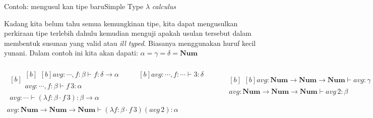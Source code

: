 \documentclass[aspectratio=1610,10pt,handout]{beamer}
\newcommand{\lc}{$\lambda$ {\it calculus}\ }
\begin{document}
\begin{frame}{Contoh: mengusul kan tipe baru}{Simple Type \lc }

	Kadang kita belum tahu semua kemungkinan tipe, kita dapat mengusulkan perkiraan tipe terlebih dahulu kemudian menguji apakah usulan tersebut dalam membentuk susunan yang valid atau \emph{ill typed}. Biasanya menggunakan huruf kecil yunani. Dalam contoh ini kita akan dapati: $\alpha = \gamma = \delta = \mathbf{Num}$

	\begingroup\tiny%
	\[
	\begin{gathered}
	\begin{gathered}[b]
	\begin{gathered}[b]
	\begin{gathered}[b]
	\hline
	\mathit{avg} : \cdots,
	f : \beta
	\vdash
	f
	:  \delta \to \alpha
	\end{gathered}
	\qquad
	\begin{gathered}[b]
	\hline
	\mathit{avg} : \cdots,
	f : \cdots
	\vdash
	3
	: \delta
	\end{gathered}
	\\
	\hline
	\mathit{avg} : \cdots,
	f : \beta
	\vdash
	f\,3
	: \alpha
	\end{gathered}\\
	\hline
	\mathit{avg} : \cdots
	\vdash
	(\lambda f : \beta \cdot f\,3)
	: \beta \to \alpha
	\end{gathered}
	\qquad
	\begin{gathered}[b]
	\begin{gathered}[b]
	\hline
	\mathit{avg} : \mathbf{Num} \to\mathbf{Num} \to\mathbf{Num} \vdash
	\mathit{avg}
	:  \gamma \to \beta
	\end{gathered}
	\qquad
	\begin{gathered}[b]
	\hline
	\mathit{avg} : \cdots
	\vdash
	2
	: \gamma
	\end{gathered}
	\\
	\hline
	\mathit{avg} :  \mathbf{Num} \to\mathbf{Num} \to\mathbf{Num}
	\vdash
	\mathit{avg}\,2
	: \beta
	\end{gathered}
	\\
	\hline
	\mathit{avg} : \mathbf{Num} \to\mathbf{Num} \to\mathbf{Num} \vdash
	(\lambda f : \beta \cdot f\,3) (\mathit{avg}\,2)
	: \alpha
	\end{gathered}
	\]
	\endgroup%

\end{frame}
\end{document}
